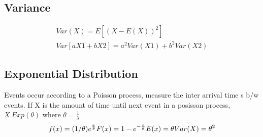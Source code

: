 \documentclass[11pt]{amsart}
\begin{document}
  \subsection{Variance}
  \begin{equation}
    \begin{aligned}
      Var(X) = E[(X-E(X))^2]\\
      Var [aX1+bX2] = a^2Var(X1)  + b^2Var(X2)
  \end{aligned}
  \end{equation}
  \subsection{Exponential Distribution}
  \par Events occur according to a Poisson process, measure the inter arrival
  time s b/w events. If X is the amount of  time until next event in a posisson
  process, $X~Exp(\theta)$ where $\theta = \frac{1}{\lambda}$
  \begin{equation}
    \begin{aligned}
      f(x) = (1/\theta) e^{\-\frac{x}{\theta}}
      F(x) = 1 - e^{-\frac{x}{\theta}}
      E(x) = \theta
      Var(X) = \theta^2
    \end{aligned}
  \end{equation}
\end{document}
